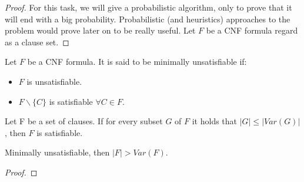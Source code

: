 \begin{proof}
For this task, we will give a probabilistic algorithm, only to prove that it will end with a big probability. Probabilistic (and heuristics) approaches to the problem would prove later on to be really useful. Let $F$ be a CNF formula regard as a clause set.
\end{proof}



\begin{definition}
Let $F$ be a CNF formula. It is said to be minimally unsatisfiable if:
\begin{itemize}
	\item $F$ is unsatisfiable.
	\item $F\backslash \{C\}$ is satisfiable $\forall C \in F$.
\end{itemize}
\end{definition}

\begin{lemma}
Let F be a set of clauses. If for every subset $G$ of $F$ it holds that $|G|\le |Var(G)|$, then $F$ is satisfiable.

\end{lemma}

\begin{proposition}
	Minimally unsatisfiable, then $|F| > Var(F)$.
\end{proposition}

\begin{proof}
	
\end{proof}







 
 



